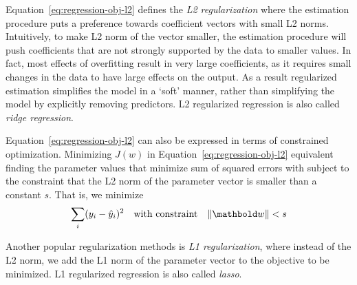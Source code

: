 Equation~\ref{eq:regression-obj-l2} defines the \emph{L2 regularization}
where the estimation procedure puts a preference towards coefficient vectors
with small L2 norms.
Intuitively, to make L2 norm of the vector smaller,
the estimation procedure will push coefficients
that are not strongly supported by the data to smaller values.
In fact, most effects of overfitting result in very large coefficients,
as it requires small changes in the data to have large effects on the output.
As a result regularized estimation simplifies the model in a `soft' manner,
rather than simplifying the model by explicitly removing predictors.
L2 regularized regression is also called \emph{ridge regression}.

Equation~\ref{eq:regression-obj-l2} can also be expressed in terms of
constrained optimization.
Minimizing $J(w)$ in Equation~\ref{eq:regression-obj-l2} 
equivalent finding the parameter values that minimize sum of squared errors
with subject to the constraint that the L2 norm of the
parameter vector is smaller than a constant $s$. That is, we minimize
\begin{equation}\label{eq:l2-constraint}
  \sum_{i} (y_{i} - \hat{y}_{i})^{2} \quad
  \text{with constraint}\quad \norm{\vect{w}} < s
\end{equation}

Another popular regularization methods is \emph{L1 regularization},
where instead of the L2 norm, we add the L1 norm of the parameter vector
to the objective to be minimized.
L1 regularized regression is also called \emph{lasso}.

